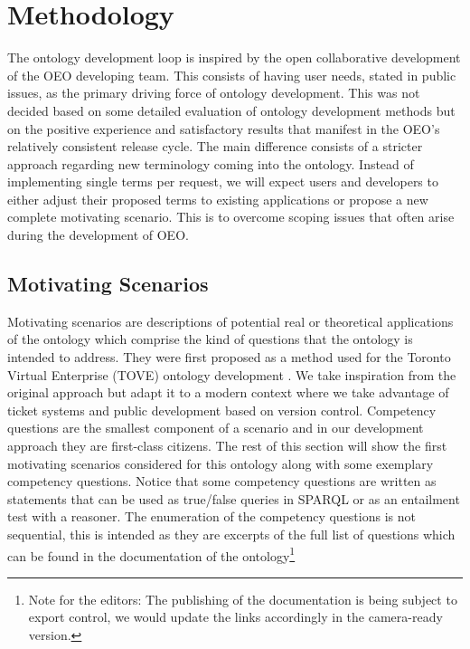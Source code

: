 ﻿\section{Methodology}
\label{methodology}

The ontology development loop is inspired by the open collaborative development
of the OEO developing team. This consists of having user needs, stated in public
issues, as the primary driving force of ontology development. This was not
decided based on some detailed evaluation of ontology development methods but on
the positive experience and satisfactory results that manifest in the OEO's
relatively consistent release cycle. The main difference consists of a stricter
approach regarding new terminology coming into the ontology. Instead of
implementing single terms per request, we will expect users and developers to
either adjust their proposed terms to existing applications or propose a new
complete motivating scenario. This is to overcome scoping issues that often
arise during the development of OEO. 


\subsection{Motivating Scenarios}

Motivating scenarios are descriptions of potential real or theoretical
applications of the ontology which comprise the kind of questions that the
ontology is intended to address.  They were first proposed as a method used for
the Toronto Virtual Enterprise (TOVE) ontology development
\cite{Gruninger.1995}. We take inspiration from the original approach but adapt
it to a modern context where we take advantage of ticket systems and public
development based on version control. Competency questions are the smallest
component of a scenario and in our development approach they are first-class
citizens. The rest of this section will show the first motivating scenarios
considered for this ontology along with some exemplary competency questions.
Notice that some competency questions are written as statements that can be
used as true/false queries in SPARQL or as an entailment test with a reasoner.
The enumeration of the competency questions is not sequential, this is intended
as they are excerpts of the full list of questions which can be found in the
documentation of the ontology\footnote{Note for the editors: The publishing of
the documentation is being subject to export control, we would update the links
accordingly in the camera-ready version. }

